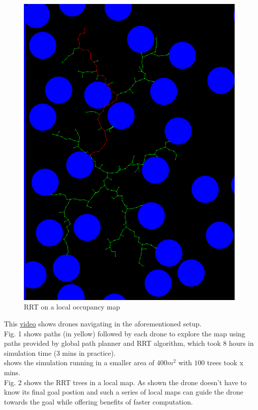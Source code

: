 \begin{figure}[h]
\centering
\includegraphics[scale=0.25]{images/rrt_drone_1_iter_6.png}
\caption{RRT on a local occupancy map}
\end{figure}
This \href{https://www.youtube.com/watch?v=JBWNEh0Fis4&ab_channel=ShantnavAgarwal}{video} shows drones navigating in the aforementioned setup.\\
Fig. 1 shows paths (in yellow) followed by each drone to explore the map using paths provided by global path planner and RRT algorithm, which took 8 hours in simulation time (3 mins in practice). \\
[picture] shows the simulation running in a smaller area of $400m^2$ with $100$ trees took x mins. \\
Fig. 2 shows the RRT trees in a local map. As shown the drone doesn't have to know its final goal postion and such a series of local maps can guide the drone towards the goal while offering benefits of faster computation.